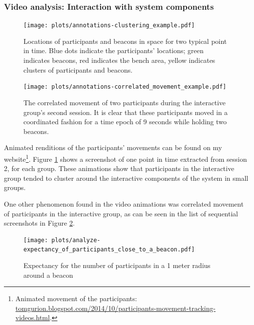 \documentclass[a4paper,11pt]{article}
\begin{document}
{\subsubsection{Video analysis: Interaction with system components}\label{results:system}

\begin{figure}[!htb]
    \centering
    \texttt{[image: plots/annotations-clustering\_example.pdf]}
    \caption{Locations of participants and beacons in space for two typical point in time. Blue dots indicate the participants' locations; green indicates beacons, red indicates the bench area, yellow indicates clusters of participants and beacons.}\label{plot:annotations-clustering_example}
\end{figure}

\begin{figure}[!htb]
    \centering
    \texttt{[image: plots/annotations-correlated\_movement\_example.pdf]}
    \caption{The correlated movement of two participants during the interactive group's second session. It is clear that these participants moved in a coordinated fashion for a time epoch of 9 seconds while holding two beacons.}\label{plot:annotations-correlated_movement_example}
\end{figure}

Animated renditions of the participants' movements can be found on my website\footnote{Animated movement of the participants: \href{http://tomgurion.blogspot.com/2014/10/participants-movement-tracking-videos.html}{tomgurion.blogspot.com/2014/10/participants-movement-tracking-videos.html}.}.
Figure \ref{plot:annotations-clustering_example} shows a screenshot of one point in time extracted from session 2, for each group.
These animations show that participants in the interactive group tended to cluster around the interactive components of the system in small groups.

One other phenomenon found in the video animations was correlated movement of participants in the interactive group, as can be seen in the list of sequential screenshots in Figure \ref{plot:annotations-correlated_movement_example}.

\begin{figure}[!htb]
    \centering
    \texttt{[image: plots/analyze-expectancy\_of\_participants\_close\_to\_a\_beacon.pdf]}
    \caption{Expectancy for the number of participants in a 1 meter radius around a beacon}\label{plot:analyze-expectancy_of_participants_close_to_a_beacon}
\end{figure}

}
\end{document}
